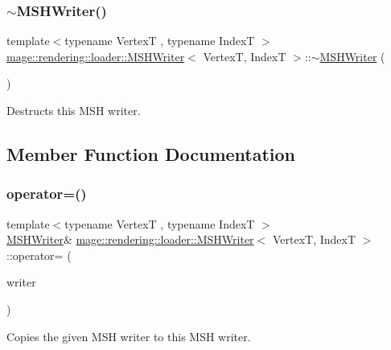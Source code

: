 \subsubsection{\texorpdfstring{$\sim$\+M\+S\+H\+Writer()}{~MSHWriter()}}
{\footnotesize\ttfamily template$<$typename VertexT , typename IndexT $>$ \\
\mbox{\hyperlink{classmage_1_1rendering_1_1loader_1_1_m_s_h_writer}{mage\+::rendering\+::loader\+::\+M\+S\+H\+Writer}}$<$ VertexT, IndexT $>$\+::$\sim$\mbox{\hyperlink{classmage_1_1rendering_1_1loader_1_1_m_s_h_writer}{M\+S\+H\+Writer}} (\begin{DoxyParamCaption}{ }\end{DoxyParamCaption})}

Destructs this M\+SH writer. 

\subsection{Member Function Documentation}
\mbox{\label{classmage_1_1rendering_1_1loader_1_1_m_s_h_writer_a661eaab96539a7bf08f100095603af0e}} 
\subsubsection{\texorpdfstring{operator=()}{operator=()}\hspace{0.1cm}{\footnotesize\ttfamily [1/2]}}
{\footnotesize\ttfamily template$<$typename VertexT , typename IndexT $>$ \\
\mbox{\hyperlink{classmage_1_1rendering_1_1loader_1_1_m_s_h_writer}{M\+S\+H\+Writer}}\& \mbox{\hyperlink{classmage_1_1rendering_1_1loader_1_1_m_s_h_writer}{mage\+::rendering\+::loader\+::\+M\+S\+H\+Writer}}$<$ VertexT, IndexT $>$\+::operator= (\begin{DoxyParamCaption}\item[{const \mbox{\hyperlink{classmage_1_1rendering_1_1loader_1_1_m_s_h_writer}{M\+S\+H\+Writer}}$<$ VertexT, IndexT $>$ \&}]{writer }\end{DoxyParamCaption})\hspace{0.3cm}{\ttfamily [delete]}}

Copies the given M\+SH writer to this M\+SH writer.


